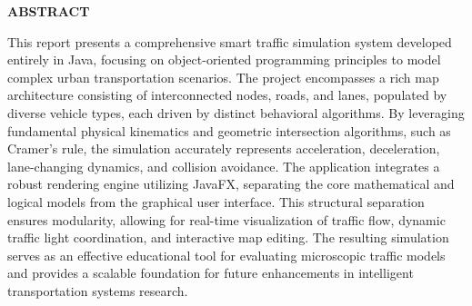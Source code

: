 \documentclass[../report_main.tex]{subfiles}
\begin{document}
\begin{center}
    \Large{\textbf{ABSTRACT}}\\
\end{center}
\vspace{1cm}

This report presents a comprehensive smart traffic simulation system developed entirely in Java, focusing on object-oriented programming principles to model complex urban transportation scenarios. The project encompasses a rich map architecture consisting of interconnected nodes, roads, and lanes, populated by diverse vehicle types, each driven by distinct behavioral algorithms. By leveraging fundamental physical kinematics and geometric intersection algorithms, such as Cramer's rule, the simulation accurately represents acceleration, deceleration, lane-changing dynamics, and collision avoidance. The application integrates a robust rendering engine utilizing JavaFX, separating the core mathematical and logical models from the graphical user interface. This structural separation ensures modularity, allowing for real-time visualization of traffic flow, dynamic traffic light coordination, and interactive map editing. The resulting simulation serves as an effective educational tool for evaluating microscopic traffic models and provides a scalable foundation for future enhancements in intelligent transportation systems research.
\end{document}
